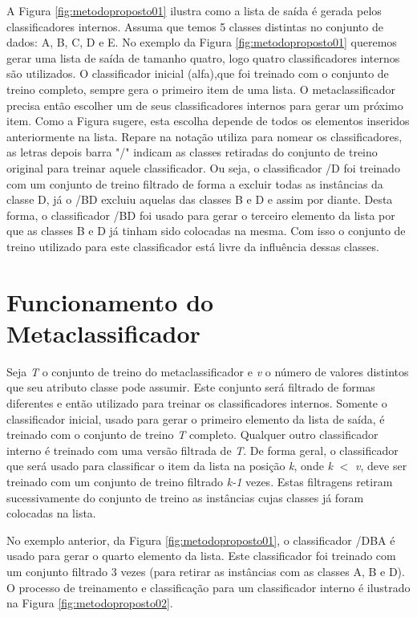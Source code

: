 A Figura \ref{fig:metodoproposto01} ilustra como a lista de saída é gerada pelos classificadores internos.
Assuma que temos 5 classes distintas no conjunto de dados: A, B, C, D e E. 
No exemplo da Figura \ref{fig:metodoproposto01} queremos gerar uma lista de saída de tamanho quatro, logo quatro classificadores internos são utilizados. 
O classificador inicial (alfa),que foi treinado com o conjunto de treino completo, sempre gera o primeiro item de uma lista. 
O metaclassificador precisa então escolher um de seus classificadores internos para gerar um próximo item. 
Como a Figura sugere, esta escolha depende de todos os elementos inseridos anteriormente na lista.
Repare na notação utiliza para nomear os classificadores, as letras depois barra "/" indicam as classes retiradas do conjunto de treino original para treinar aquele classificador.
Ou seja, o classificador /D foi treinado com um conjunto de treino filtrado de forma a excluir todas as instâncias da classe D, já o /BD excluiu aquelas das classes B e D e assim por diante.
Desta forma, o classificador /BD foi usado para gerar o terceiro elemento da lista por que as classes B e D já tinham sido colocadas na mesma.
Com isso o conjunto de treino utilizado para este classificador está livre da influência dessas classes.

\section{Funcionamento do Metaclassificador}

Seja \textit{T} o conjunto de treino do metaclassificador e \textit{v} o número de valores distintos que seu atributo classe pode assumir. 
Este conjunto será filtrado de formas diferentes e então utilizado para treinar os classificadores internos. 
Somente o classificador inicial, usado para gerar o primeiro elemento da lista de saída, é treinado com o conjunto de treino \textit{T} completo. 
Qualquer outro classificador interno é treinado com uma versão filtrada de  \textit{T}. 
De forma geral, o classificador que será usado para classificar o item da lista na posição \textit{k}, onde \textit{k} $<$ \textit{v}, deve ser treinado com um conjunto de treino filtrado \textit{k-1} vezes. 
Estas filtragens retiram sucessivamente do conjunto de treino as instâncias cujas classes já foram colocadas na lista.

No exemplo anterior, da Figura \ref{fig:metodoproposto01}, o classificador /DBA é usado para gerar o quarto elemento da lista.
Este classificador foi treinado com um conjunto filtrado 3 vezes (para retirar as instâncias com as classes A, B e D).
O processo de treinamento e classificação para um classificador interno é ilustrado na Figura \ref{fig:metodoproposto02}.

